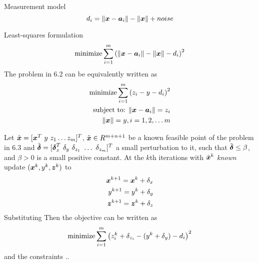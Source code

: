Measurement model
\begin{equation} \label{eq:6.1}
d_i = \|\mbox{\boldmath$x$} - \mbox{\boldmath$a$}_i\| - \|\mbox{\boldmath$x$}\| + noise
\end{equation}

Least-squares formulation
\begin{equation} \label{eq:6.2}
\mathop{\mbox{minimize}} \sum^m_{i=1}\left( \|\mbox{\boldmath$x$} - \mbox{\boldmath$a$}_i\| - \|\mbox{\boldmath$x$}\| - d_i\right)^2
\end{equation}
The problem in 6.2 can be equivalently written as
\begin{eqnarray} \label{eq:6.3}
\mathop{\mbox{minimize}} \sum^m_{i=1}\left( z_i - y - d_i\right)^2\\
\nonumber
\mbox{subject to: } \|\mbox{\boldmath$x$} - \mbox{\boldmath$a$}_i\| = z_i \\
\nonumber
\|\mbox{\boldmath$x$}\| = y, i = 1, 2, \ldots m
\end{eqnarray}

Let $\tilde{\mbox{\boldmath$x$}} = [\mbox{\boldmath$x$}^T \ y \ z_1 \ldots z_m]^T$, $\tilde{\mbox{\boldmath$x$}} \in R^{m+n+1}$ be a known feasible point of the problem in 6.3 and $\tilde{\Bdelta} = [\Bdelta_x^T \  \delta_y \ \delta_{z_1} \ \ldots \  \delta_{z_m}]^T$ a small perturbation to it, such that $\tilde{\mbox{\boldmath${\delta}$}} \leq \beta$, and $\beta > 0$ is a small positive constant. At the $k$th iterations with $\tilde{\mbox{\boldmath$x$}}^k$ \textit{known} update $(\mbox{\boldmath$x$}^k, y^k, \mbox{\boldmath$z$}^k)$ to 
\begin{eqnarray} \label{eq:6.4}
\mbox{\boldmath$x$}^{k+1} = \mbox{\boldmath$x$}^k + \delta_x \\
\nonumber
y^{k+1} = y^k + \delta_y \\
\nonumber
\mbox{\boldmath$z$}^{k+1} = \mbox{\boldmath$z$}^k + \delta_z
\end{eqnarray}
Substituting
Then the objective can be written as
\begin{equation}
\nonumber
\mathop{\mbox{minimize}} \sum^m_{i = 1} \left(z^k_i + \delta_{z_i} - (y^k + \delta_y) - d_i \right)^2
\end{equation}
and the constraints
..